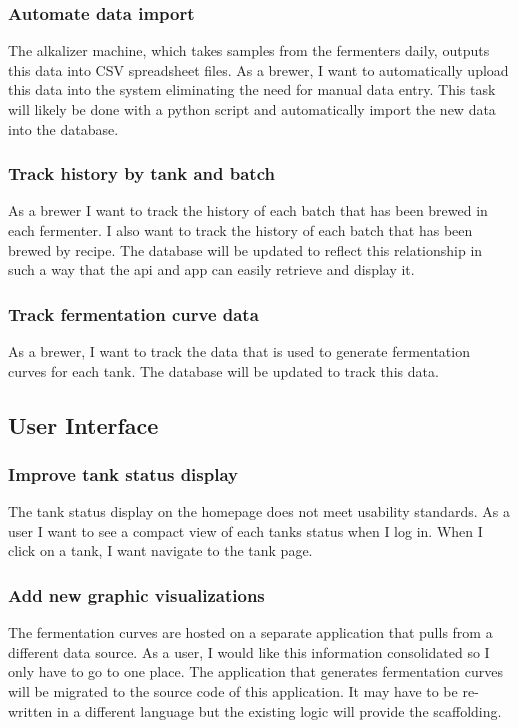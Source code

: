 \documentclass[draftclsnofoot,onecolumn,journal,letterpaper,compsoc,10pt]{IEEEtran}
\begin{document}
        \subsubsection{Automate data import}
        The alkalizer machine, which takes samples from the fermenters daily, outputs this data into CSV spreadsheet files. As a brewer, I want to automatically upload this data into the system eliminating the need for manual data entry. This task will likely be done with a python script and automatically import the new data into the database.
        \subsubsection{Track history by tank and batch}
        As a brewer I want to track the history of each batch that has been brewed in each fermenter. I also want to track the history of each batch that has been brewed by recipe. The database will be updated to reflect this relationship in such a way that the api and app can easily retrieve and display it.
        \subsubsection{Track fermentation curve data}
        As a brewer, I want to track the data that is used to generate fermentation curves for each tank. The database will be updated to track this data.
    \subsection{User Interface}
        \subsubsection{Improve tank status display}
        The tank status display on the homepage does not meet usability standards. As a user I want to see a compact view of each tanks status when I log in. When I click on a tank, I want navigate to the tank page. 
        \subsubsection{Add new graphic visualizations}
        The fermentation curves are hosted on a separate application that pulls from a different data source. As a user, I would like this information consolidated so I only have to go to one place. The application that generates fermentation curves will be migrated to the source code of this application. It may have to be re-written in a different language but the existing logic will provide the scaffolding. 
\end{document}
